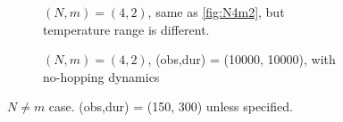 \documentclass[12pt]{article}
\begin{document}
\begin{figure}
	\begin{subfigure}{.47\textwidth}
		\centering
		\caption{\((N,m)=(4,2)\), same as \ref{fig:N4m2}, but temperature range is different.}
		\label{fig:N4m2_T}
	\end{subfigure}%
	\quad
	\begin{subfigure}{.47\textwidth}
		\centering
		\caption{\((N,m)=(4,2)\), (obs,dur) = (10000, 10000), with no-hopping dynamics}
		\label{fig:N4m3_alt}
	\end{subfigure}%
	
	\caption{\(N\neq m\) case. (obs,dur) = (150, 300) unless specified.}
	\label{fig_Nm}
\end{figure}
\end{document}
